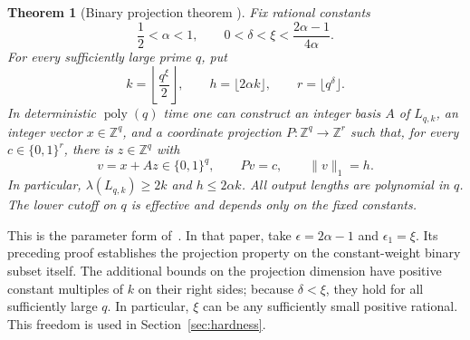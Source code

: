 \documentclass[11pt,letterpaper]{article}
\numberwithin{equation}{section}
\newtheorem{theorem}{Theorem}[section]
\theoremstyle{definition}
\theoremstyle{remark}
\newcommand{\Z}{\mathbb Z}
\begin{document}
\begin{samepage}
\begin{theorem}[Binary projection theorem {\cite{wan}}]\label{thm:gadget}
Fix rational constants
\begin{equation}\label{eq:gadget-exponents}
 \frac12<\alpha<1,\qquad 0<\delta<\xi<\frac{2\alpha-1}{4\alpha}.
\end{equation}
For every sufficiently large prime $q$, put
\begin{equation}\label{eq:gadget-parameters}
 k=\left\lfloor\frac{q^\xi}{2}\right\rfloor,
 \qquad h=\lfloor2\alpha k\rfloor,
 \qquad r=\lfloor q^\delta\rfloor.
\end{equation}
In deterministic $\operatorname{poly}(q)$ time one can construct an integer basis $A$ of $L_{q,k}$, an integer vector $x\in\Z^q$, and a coordinate projection $P:\Z^q\to\Z^r$ such that, for every $c\in\{0,1\}^r$, there is $z\in\Z^q$ with
\begin{equation}\label{eq:binary-projection}
 v=x+Az\in\{0,1\}^q,\qquad Pv=c,\qquad \|v\|_1=h.
\end{equation}
In particular, $\lambda(L_{q,k})\ge2k$ and $h\le2\alpha k$. All output lengths are polynomial in $q$. The lower cutoff on $q$ is effective and depends only on the fixed constants.
\end{theorem}
\end{samepage}

This is the parameter form of~\cite[Theorem 7.3 and its preceding binary-surjectivity proof]{wan}. In that paper, take $\epsilon=2\alpha-1$ and $\epsilon_1=\xi$. Its preceding proof establishes the projection property on the constant-weight binary subset itself. The additional bounds on the projection dimension have positive constant multiples of $k$ on their right sides; because $\delta<\xi$, they hold for all sufficiently large $q$. In particular, $\xi$ can be any sufficiently small positive rational. This freedom is used in Section~\ref{sec:hardness}.
\end{document}
